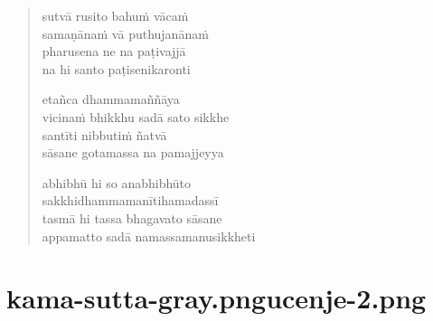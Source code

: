 \begin{verse}
sutvā rusito bahuṁ vācaṁ\\
samaṇānaṁ vā puthujanānaṁ\\
pharusena ne na paṭivajjā\\
na hi santo paṭisenikaronti

etañca dhammamaññāya\\
vicinaṁ bhikkhu sadā sato sikkhe\\
santīti nibbutiṁ ñatvā\\
sāsane gotamassa na pamajjeyya

abhibhū hi so anabhibhūto\\
sakkhidhammamanītihamadassī\\
tasmā hi tassa bhagavato sāsane\\
appamatto sadā namassamanusikkheti

\end{verse}


\chapter[Tuvaṭaka Sutta]{{kama-sutta-gray.png}{ucenje-2.png}}

